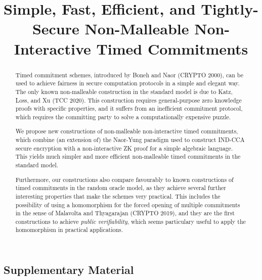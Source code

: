 \documentclass{llncs}
\author{\vspace{-5mm}}
\institute{\vspace{-5mm}}
\begin{document}
\title{Simple, Fast, Efficient, and Tightly-Secure Non-Malleable Non-Interactive Timed Commitments}


\maketitle
\begin{abstract}
Timed commitment schemes, introduced by Boneh and Naor (CRYPTO 2000), can be used to achieve fairness in secure computation protocols in a simple and elegant way.
The only known non-malleable construction in the standard model is due to Katz, Loss, and Xu (TCC 2020). This construction requires general-purpose zero knowledge proofs with specific properties, and it suffers from an inefficient commitment protocol, which requires the committing party to solve a computationally expensive puzzle.

We propose new constructions of non-malleable non-interactive timed commitments, which combine (an extension of) the Naor-Yung paradigm used to construct IND-CCA secure encryption with a non-interactive ZK proof for a simple algebraic language. This yields much simpler and more efficient non-malleable timed commitments in the standard model.

Furthermore, our constructions also compare favourably to known constructions of timed commitments in the random oracle model, as they achieve several further interesting properties that make the schemes very practical. This includes the possibility of using a homomorphism for the forced opening of multiple commitments in the sense of Malavolta and Thyagarajan (CRYPTO 2019), and they are the first constructions to achieve \emph{public verifiability}, which seems particulary useful to apply the homomorphism in practical applications.
\end{abstract}


















\begin{appendix}
\chapter*{Supplementary Material}
%


\end{appendix}
\end{document}
